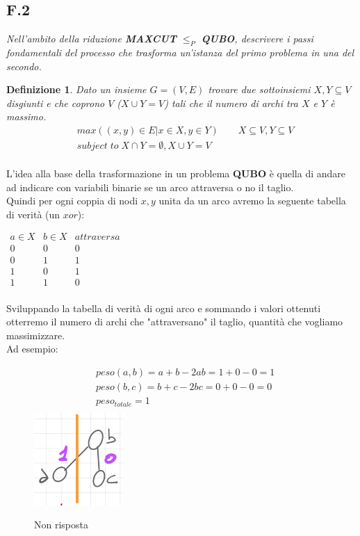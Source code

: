 \documentclass[a4paper]{article}
\newtheorem*{definition}{Definizione}
\begin{document}
\subsection{F.2}
\label{SEC:F2}
\emph{Nell’ambito della riduzione \textbf{MAXCUT} $\leq_P$ \textbf{QUBO}, descrivere i passi fondamentali del processo che trasforma un’istanza del primo problema in una del secondo.}
\begin{definition}
	Dato un insieme $G=(V,E)$ trovare due sottoinsiemi $X,Y \subseteq V$ disgiunti e che coprono $V$ ($X \cup Y = V$) tali che il numero di archi tra $X$ e $Y$ è massimo.
	\begin{align*}
		& max((x,y) \in E \vert x \in X, y \in Y) \qquad X \subseteq V, Y \subseteq V \\
		& subject \; to \; X \cap Y = \emptyset , X \cup Y = V\\
	\end{align*}
\end{definition}
L'idea alla base della trasformazione in un problema \textbf{QUBO} è quella di andare ad indicare con variabili binarie se un arco attraversa o no il taglio.\\
Quindi per ogni coppia di nodi $x,y$ unita da un arco avremo la seguente tabella di verità (un $xor$):
\begin{center}$\begin{array}{c|c|c}
 a \in X & b \in X & attraversa \\
\hline
 0 & 0 & 0  \\ 
 0 & 1 & 1  \\
 1 & 0 & 1  \\
 1 & 1 & 0  \\ %
\end{array}$
\end{center}
Sviluppando la tabella di verità di ogni arco e sommando i valori ottenuti otterremo il numero di archi che "attraversano" il taglio, quantità che vogliamo massimizzare.\\
Ad esempio:\\
\begin{figure}[!ht]
                \centering
		\begin{align*}
			& peso(a,b) = a + b -2ab = 1 + 0 - 0 = 1 \\
			& peso(b,c) = b + c -2bc = 0 + 0 - 0 = 0 \\
			& peso_{totale} = 1\\
		\end{align*}
                \includegraphics[width = 0.3\textwidth]{./img/F2_NR.png}
                \caption{Non risposta} \label{FIG:F2_false}
\end{figure}\\
\end{document}
